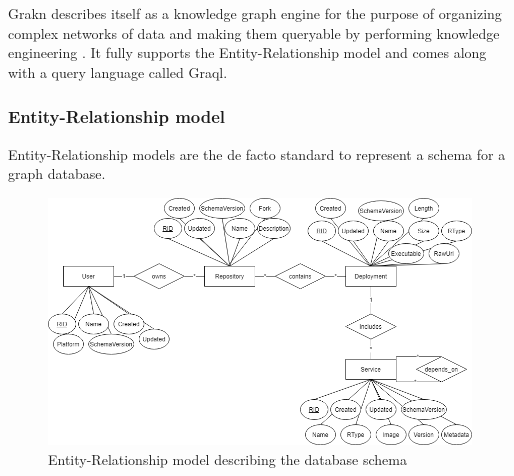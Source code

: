 Grakn describes itself as a knowledge graph engine for the purpose of organizing complex networks of data and making them queryable by performing knowledge engineering \cite{grakn}. It fully supports the Entity-Relationship model and comes along with a query language called Graql. 

\subsubsection{Entity-Relationship model}
Entity-Relationship models are the de facto standard to represent a schema for a graph database.
\begin{figure}[H]
    \centering
    \includegraphics[width=0.8\paperwidth,height=0.8\paperheight,keepaspectratio,angle=270]{graphics/er_database_new.png}
    \caption{Entity-Relationship model describing the database schema}
    \label{fig:er_model}
\end{figure}

